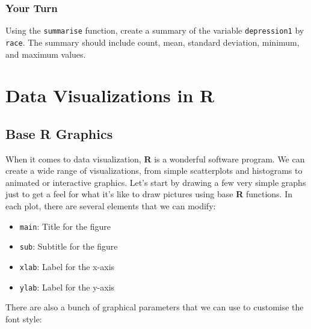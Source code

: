 \documentclass[]{book}
\providecommand{\tightlist}{%
  \setlength{\itemsep}{0pt}\setlength{\parskip}{0pt}}
\begin{document}
\hypertarget{your-turn-5}{%
\subsection{Your Turn}\label{your-turn-5}}

Using the \texttt{summarise} function, create a summary of the variable \texttt{depression1} by \texttt{race}. The summary should include count, mean, standard deviation, minimum, and maximum values.

\hypertarget{part4}{%
\chapter{\texorpdfstring{Data Visualizations in \textbf{R}}{Data Visualizations in R}}\label{part4}}

\hypertarget{base-r-graphics}{%
\section{\texorpdfstring{Base \textbf{R} Graphics}{Base R Graphics}}\label{base-r-graphics}}

When it comes to data visualization, \textbf{R} is a wonderful software program. We can create a wide range of visualizations, from simple scatterplots and histograms to animated or interactive graphics. Let's start by drawing a few very simple graphs just to get a feel for what it's like to draw pictures using base \textbf{R} functions. In each plot, there are several elements that we can modify:

\begin{itemize}
\tightlist
\item
  \texttt{main}: Title for the figure
\item
  \texttt{sub}: Subtitle for the figure
\item
  \texttt{xlab}: Label for the x-axis
\item
  \texttt{ylab}: Label for the y-axis
\end{itemize}

There are also a bunch of graphical parameters that we can use to customise the font style:
\end{document}
